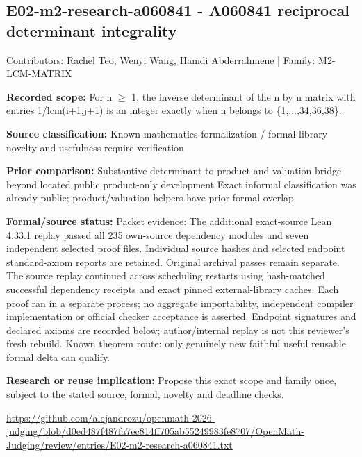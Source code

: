 \documentclass[11pt,a4paper]{article}
\begin{document}
\begin{samepage}
\subsection{E02-m2-research-a060841  -  A060841 reciprocal determinant integrality}
{\small Contributors: Rachel Teo, Wenyi Wang, Hamdi Abderrahmene | Family: M2-LCM-MATRIX\par}

\textbf{Recorded scope:} For n \ensuremath{\geq} 1, the inverse determinant of the n by n matrix with entries 1/lcm(i+1,j+1) is an integer exactly when n belongs to \{1,...,34,36,38\}.

\end{samepage}
\textbf{Source classification:} Known-mathematics formalization / formal-library novelty and usefulness require verification

\textbf{Prior comparison:} Substantive determinant-to-product and valuation bridge beyond located public product-only development Exact informal classification was already public; product/valuation helpers have prior formal overlap

\textbf{Formal/source status:} Packet evidence: The additional exact-source Lean 4.33.1 replay passed all 235 own-source dependency modules and seven independent selected proof files. Individual source hashes and selected endpoint standard-axiom reports are retained. Original archival passes remain separate. The source replay continued across scheduling restarts using hash-matched successful dependency receipts and exact pinned external-library caches. Each proof ran in a separate process; no aggregate importability, independent compiler implementation or official checker acceptance is asserted. Endpoint signatures and declared axioms are recorded below; author/internal replay is not this reviewer's fresh rebuild. Known theorem route: only genuinely new faithful useful reusable formal delta can qualify.

\textbf{Research or reuse implication:} Propose this exact scope and family once, subject to the stated source, formal, novelty and deadline checks.

{\small \url{https://github.com/alejandrozu/openmath-2026-judging/blob/d0ed487f487fa7ec814ff705ab55249983fe8707/OpenMath-Judging/review/entries/E02-m2-research-a060841.txt}\par}
\end{document}
